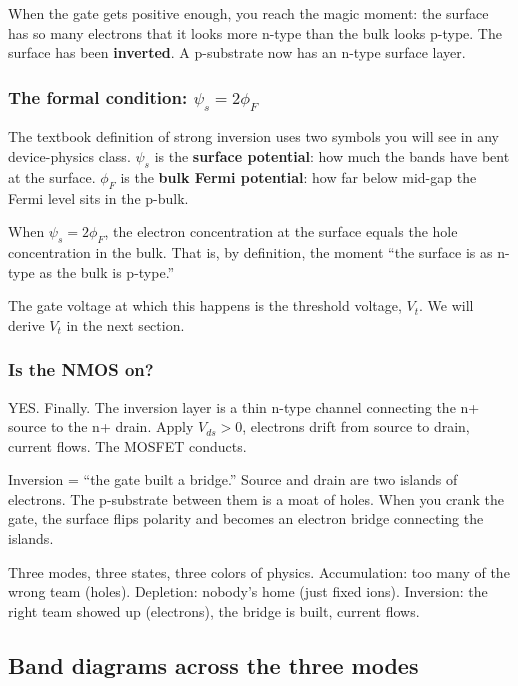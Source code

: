 \documentclass[11pt]{article}
\begin{document}
When the gate gets positive enough, you reach the magic moment: the surface has so many electrons that it looks more n-type than the bulk looks p-type. The surface has been \textbf{inverted}. A p-substrate now has an n-type surface layer.

\subsubsection{The formal condition: $\psi_s = 2\phi_F$}

The textbook definition of strong inversion uses two symbols you will see in any device-physics class. $\psi_s$ is the \textbf{surface potential}: how much the bands have bent at the surface. $\phi_F$ is the \textbf{bulk Fermi potential}: how far below mid-gap the Fermi level sits in the p-bulk.

When $\psi_s = 2\phi_F$, the electron concentration at the surface equals the hole concentration in the bulk. That is, by definition, the moment ``the surface is as n-type as the bulk is p-type.''

The gate voltage at which this happens is the threshold voltage, $V_t$. We will derive $V_t$ in the next section.

\subsubsection{Is the NMOS on?}

YES. Finally. The inversion layer is a thin n-type channel connecting the n+ source to the n+ drain. Apply $V_{ds} > 0$, electrons drift from source to drain, current flows. The MOSFET conducts.

\begin{hook}
Inversion = ``the gate built a bridge.'' Source and drain are two islands of electrons. The p-substrate between them is a moat of holes. When you crank the gate, the surface flips polarity and becomes an electron bridge connecting the islands.
\end{hook}

\begin{pause}
Three modes, three states, three colors of physics. Accumulation: too many of the wrong team (holes). Depletion: nobody's home (just fixed ions). Inversion: the right team showed up (electrons), the bridge is built, current flows.
\end{pause}

\subsection{Band diagrams across the three modes}
\end{document}
